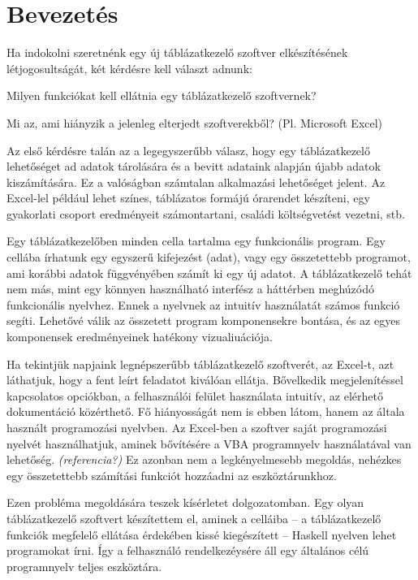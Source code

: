 \chapter{Bevezetés} %
\label{ch:intro}

Ha indokolni szeretnénk egy új táblázatkezelő szoftver elkészítésének létjogosultságát, két kérdésre kell választ adnunk:
\begin{compactenum}
	\item Milyen funkciókat kell ellátnia egy táblázatkezelő szoftvernek?
	\item Mi az, ami hiányzik a jelenleg elterjedt szoftverekből? (Pl. Microsoft Excel)
\end{compactenum}

Az első kérdésre talán az a legegyszerűbb válasz, hogy egy táblázatkezelő lehetőséget ad adatok tárolására és a bevitt adataink alapján újabb adatok kiszámítására. Ez a valóságban számtalan alkalmazási lehetőséget jelent. Az Excel-lel például lehet színes, táblázatos formájú órarendet készíteni, egy gyakorlati csoport eredményeit számontartani, családi költségvetést vezetni, stb. 

Egy táblázatkezelőben minden cella tartalma egy funkcionális program. Egy cellába írhatunk egy egyszerű kifejezést (adat), vagy egy összetettebb programot, ami korábbi adatok függvényében számít ki egy új adatot. A táblázatkezelő tehát nem más, mint egy könnyen használható interfész a háttérben meghúzódó funkcionális nyelvhez. Ennek a nyelvnek az intuitív használatát számos funkció segíti. Lehetővé válik az összetett program komponensekre bontása, és az egyes komponensek eredményeinek hatékony vizualiuációja.

Ha tekintjük napjaink legnépszerűbb táblázatkezelő szoftverét, az Excel-t, azt láthatjuk, hogy a fent leírt feladatot kiválóan ellátja. Bővelkedik megjelenítéssel kapcsolatos opciókban, a felhasználói felület használata intuitív, az elérhető dokumentáció közérthető. Fő hiányosságát nem is ebben látom, hanem az általa használt programozási nyelvben. Az Excel-ben a szoftver saját programozási nyelvét használhatjuk, aminek bővítésére a VBA programnyelv használatával van lehetőség. \textit{(referencia?)} Ez azonban nem a legkényelmesebb megoldás, nehézkes egy összetettebb számítási funkciót hozzáadni az eszköztárunkhoz.

Ezen probléma megoldására teszek kísérletet dolgozatomban. Egy olyan táblázatkezelő szoftvert készítettem el, aminek a celláiba -- a táblázatkezelő funkciók megfelelő ellátása érdekében kissé kiegészített -- Haskell nyelven lehet programokat írni. Így a felhasználó rendelkezéysére áll egy általános célú programnyelv teljes eszköztára. 